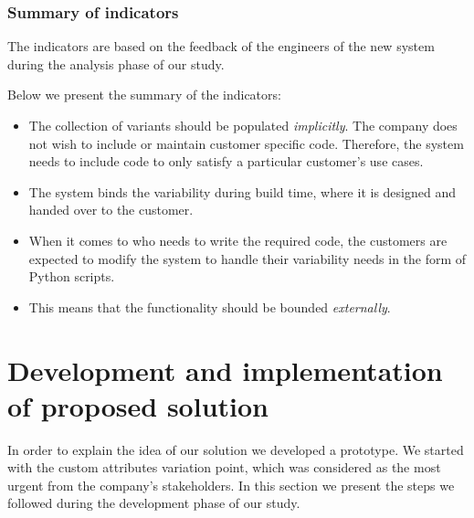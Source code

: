 \subsubsection*{Summary of indicators}

 The indicators are based on the feedback of the engineers of the new system during the analysis phase of our study. 

Below we present the summary of the indicators:\\

\begin{itemize}



\item The collection of variants should be populated \textit{implicitly}. The company does not wish to include or maintain customer specific code. Therefore, the system needs to include code to only satisfy a particular customer's use cases.

\item The system binds the variability during build time, where it is designed and handed over to the customer.

\item When it comes to who needs to write the required code, the customers are expected to modify the system to handle their variability needs in the form of Python scripts.

\item This means that the functionality should be bounded \textit{externally}. 


\end{itemize}




\section{Development and implementation of proposed solution}

In order to explain the idea of our solution we developed a prototype. 
We started with the custom attributes variation point, which was considered as the most urgent from the company's stakeholders. 
In this section we present the steps we followed during the development phase of our study. %


